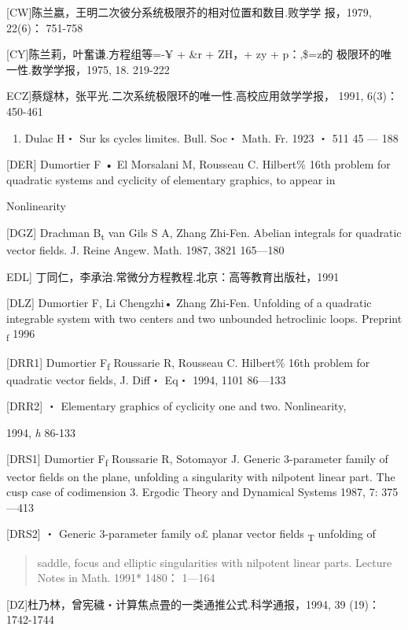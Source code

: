 {[}CW{]}陈兰嬴，王明二次彼分系统极限芥的相对位置和数目.败学学 报，1979,
22(6)： 751-758

{[}CY{]}陈兰莉，叶奮谦.方程组等=-¥ + \&r + ZH，+ zy + p：,\$=z的
极限环的唯一性.数学学报，1975, 18. 219-222

ECZ{]}蔡燧林，张平光.二次系统极限环的唯一性.高校应用敛学学报， 1991,
6(3)： 450-461

\begin{enumerate}
\def\labelenumi{\Alph{enumi}.}
\setcounter{enumi}{3}
\item
  Dulac H・ Sur ks cycles limites. Bull. Soc・ Math. Fr. 1923 ・ 511 45
  --- 188
\end{enumerate}

{[}DER{]} Dumortier F • El Morsalani M, Rousseau C. Hilbert\% 16th
problem for quadratic systems and cyclicity of elementary graphics, to
appear in

Nonlinearity

{[}DGZ{]} Drachman B\textsubscript{t} van Gils S A, Zhang Zhi-Fen.
Abelian integrals for quadratic vector fields. J. Reine Angew. Math.
1987, 3821 165---180

EDL{]} 丁同仁，李承治.常微分方程教程.北京：高等教育出版社，1991

{[}DLZ{]} Dumortier F, Li Chengzhi• Zhang Zhi-Fen. Unfolding of a
quadratic integrable system with two centers and two unbounded
hetroclinic loops. Preprint \textsubscript{f} 1996

{[}DRR1{]} Dumortier F\textsubscript{f} Roussarie R, Rousseau C.
Hilbert\% 16th problem for quadratic vector fields, J. Diff・ Eq・ 1994,
1101 86---133

{[}DRR2{]} ・ Elementary graphics of cyclicity one and two.
Nonlinearity,

1994, \emph{h} 86-133

{[}DRS1{]} Dumortier F\textsubscript{f} Roussarie R, Sotomayor J.
Generic 3-parameter family of vector fields on the plane, unfolding a
singularity with nilpotent linear part. The cusp case of codimension 3.
Ergodic Theory and Dy­namical Systems 1987, 7: 375---413

{[}DRS2{]} ・ Generic 3-parameter family o£ planar vector fields
\textsubscript{T} unfolding of

\begin{quote}
saddle, focus and elliptic singularities with nilpotent linear parts.
Lec­ture Notes in Math. 1991* 1480： 1---164
\end{quote}

{[}DZ{]}杜乃林，曾宪穢・计算焦点畳的一类通推公式.科学通报，1994, 39
(19)： 1742-1744

